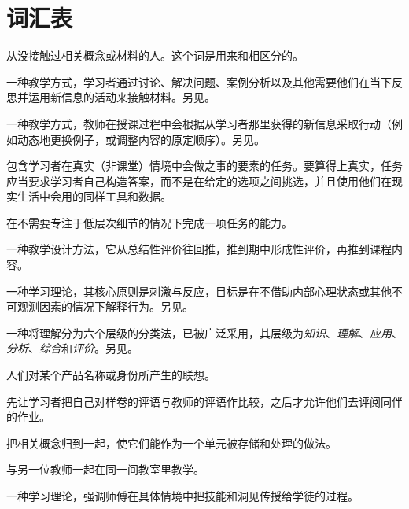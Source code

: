 \chapter{词汇表}\label{s:gloss}

\begin{description}

 从没接触过相关概念或材料的人。这个词是用来和相区分的。

 一种教学方式，学习者通过讨论、解决问题、案例分析以及其他需要他们在当下反思并运用新信息的活动来接触材料。另见。

 一种教学方式，教师在授课过程中会根据从学习者那里获得的新信息采取行动（例如动态地更换例子，或调整内容的原定顺序）。另见。

 包含学习者在真实（非课堂）情境中会做之事的要素的任务。要算得上真实，任务应当要求学习者自己构造答案，而不是在给定的选项之间挑选，并且使用他们在现实生活中会用的同样工具和数据。

 在不需要专注于低层次细节的情况下完成一项任务的能力。

 一种教学设计方法，它从总结性评价往回推，推到期中形成性评价，再推到课程内容。

 一种学习理论，其核心原则是刺激与反应，目标是在不借助内部心理状态或其他不可观测因素的情况下解释行为。另见。

 一种将理解分为六个层级的分类法，已被广泛采用，其层级为\emph{知识}、\emph{理解}、\emph{应用}、\emph{分析}、\emph{综合}和\emph{评价}。另见。

 人们对某个产品名称或身份所产生的联想。

 先让学习者把自己对样卷的评语与教师的评语作比较，之后才允许他们去评阅同伴的作业。

 把相关概念归到一起，使它们能作为一个单元被存储和处理的做法。

 与另一位教师一起在同一间教室里教学。

 一种学习理论，强调师傅在具体情境中把技能和洞见传授给学徒的过程。


\end{description}
